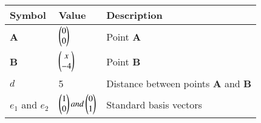 \begin{tabular}{|m{5em} | m{5em} | m{10em} |}
	\hline
	\textbf{Symbol} & \textbf{Value} &\textbf{Description}\\
	\hline
		\textbf{A} & $\begin{pmatrix}0\\0\end{pmatrix}$ & Point \textbf{A}\\
	\hline
		\textbf{B} & $\begin{pmatrix}x\\-4\end{pmatrix}$ & Point \textbf{B}\\
	\hline
		$d$        & 5              & Distance between points \textbf{A} and \textbf{B}\\
	\hline
    $e_1$ and $e_2$ & $\begin{pmatrix}1\\0\end{pmatrix} and \begin{pmatrix}0\\1\end{pmatrix}$   &  Standard basis vectors\\
    \hline
\end{tabular}
